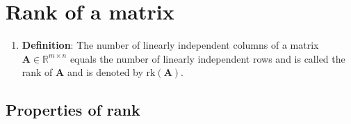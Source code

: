 \section{Rank of a matrix}

\begin{enumerate}
    \item \textbf{Definition}: The number of linearly independent columns of a matrix $\bm{A} \in \mathbb{R}^{m\times n}$ equals the number of linearly independent rows and is called the rank of $\bm{A}$ and is denoted by $\text{rk}(\bm{A})$.
    \hfill \cite{mfml/book/mml/Deisenroth-Faisal-Ong}

\end{enumerate}


\subsection{Properties of rank}

